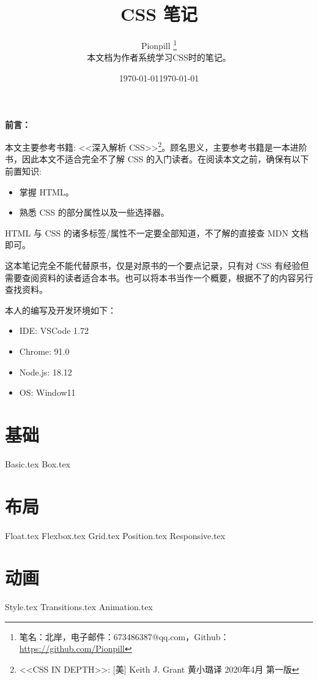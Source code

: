 \documentclass{PionpillNote-book}
\title{CSS 笔记}
\author{
    Pionpill \footnote{笔名：北岸，电子邮件：673486387@qq.com，Github：\url{https://github.com/Pionpill}} \\
    本文档为作者系统学习CSS时的笔记。\\
}
\date{\today}
\begin{document}
\pagestyle{plain}
\maketitle

\noindent\textbf{前言：}

本文主要参考书籍: <<深入解析 CSS>>\footnote{<<CSS IN DEPTH>>: [美] Keith J. Grant 黄小璐译 2020年4月 第一版}。顾名思义，主要参考书籍是一本进阶书，因此本文不适合完全不了解 CSS 的入门读者。在阅读本文之前，确保有以下前置知识:
\begin{itemize}
    \item 掌握 HTML。
    \item 熟悉 CSS 的部分属性以及一些选择器。
\end{itemize}

HTML 与 CSS 的诸多标签/属性不一定要全部知道，不了解的直接查 MDN 文档即可。

这本笔记完全不能代替原书，仅是对原书的一个要点记录，只有对 CSS 有经验但需要查阅资料的读者适合本书。也可以将本书当作一个概要，根据不了的内容另行查找资料。

本人的编写及开发环境如下：
\begin{itemize}
    \item IDE: VSCode 1.72 
    \item Chrome: 91.0
    \item Node.js: 18.12
    \item OS: Window11
\end{itemize}

\date{\today}
\newpage

\tableofcontents

\newpage

\setcounter{page}{1} 
\pagestyle{fancy}

\chapter{基础}
{Basic.tex}
{Box.tex}
\chapter{布局}
{Float.tex}
{Flexbox.tex}
{Grid.tex}
{Position.tex}
{Responsive.tex}
\chapter{动画}
{Style.tex}
{Transitions.tex}
{Animation.tex}
\end{document}
